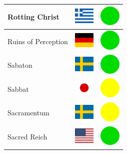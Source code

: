 \documentclass[12pt, a4paper, twoside]{report}
\begin{document}
\begin{center}
\begin{longtable}{|p{5cm}|p{2cm}|p{2cm}|}
 Rotting Christ                                             & \includegraphics[width=1cm]{../img/flags/gr} &   \includegraphics[width=1cm]{../likes/y} \\ \hline
 Ruins of Perception                                        & \includegraphics[width=1cm]{../img/flags/de} &   \includegraphics[width=1cm]{../likes/y} \\ \hline
 Sabaton                                                    & \includegraphics[width=1cm]{../img/flags/se} &   \includegraphics[width=1cm]{../likes/y} \\ \hline
 Sabbat                                                     & \includegraphics[width=1cm]{../img/flags/jp} &   \includegraphics[width=1cm]{../likes/m} \\ \hline
 Sacramentum﻿                                                & \includegraphics[width=1cm]{../img/flags/se} &   \includegraphics[width=1cm]{../likes/m} \\ \hline
 Sacred Reich                                               & \includegraphics[width=1cm]{../img/flags/us} &   \includegraphics[width=1cm]{../likes/y} \\ \hline

\end{longtable}
\end{center}
\end{document}
